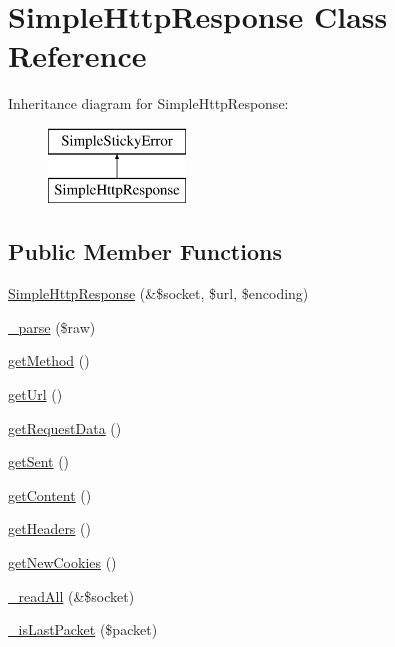 \hypertarget{class_simple_http_response}{
\section{SimpleHttpResponse Class Reference}
\label{class_simple_http_response}
}
Inheritance diagram for SimpleHttpResponse:\begin{figure}[H]
\begin{center}
\leavevmode
\includegraphics[height=2.000000cm]{class_simple_http_response}
\end{center}
\end{figure}
\subsection*{Public Member Functions}
\begin{DoxyCompactItemize}
\item 
\hyperlink{class_simple_http_response_a310e299fbb90b5943491ddf86bcd73dd}{SimpleHttpResponse} (\&\$socket, \$url, \$encoding)
\item 
\hyperlink{class_simple_http_response_a058da3bdd5e2f0589a9a8c807fe69fec}{\_\-parse} (\$raw)
\item 
\hyperlink{class_simple_http_response_ac3d79c4f31fae4ea243e1d08e6609ad8}{getMethod} ()
\item 
\hyperlink{class_simple_http_response_a2241dc18405a1f831af92943df1104ed}{getUrl} ()
\item 
\hyperlink{class_simple_http_response_a235dd94a72d35d5c61098fc9625baf72}{getRequestData} ()
\item 
\hyperlink{class_simple_http_response_a91e656519057e83140787b521cae9a56}{getSent} ()
\item 
\hyperlink{class_simple_http_response_a51520abd6975a68164b5575ce09d7e97}{getContent} ()
\item 
\hyperlink{class_simple_http_response_a64145c3fecb25cea2c6df4dd0b620ef0}{getHeaders} ()
\item 
\hyperlink{class_simple_http_response_a20d75659a803bc420d702951e0435a1d}{getNewCookies} ()
\item 
\hyperlink{class_simple_http_response_a91aa023b717df912b4dc6696107f76c4}{\_\-readAll} (\&\$socket)
\item 
\hyperlink{class_simple_http_response_abdc81c212568dd3fdeabef1856ba8579}{\_\-isLastPacket} (\$packet)
\end{DoxyCompactItemize}
